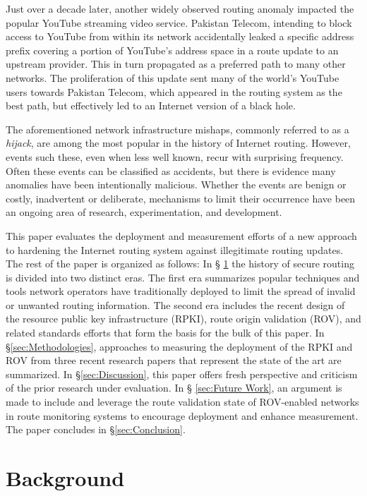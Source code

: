 \documentclass[sigconf]{acmart}
\begin{document}
Just over a decade later, another widely observed routing anomaly
impacted the popular YouTube streaming video
service.\cite{brown_pakistan_2008}  Pakistan Telecom, intending to block
access to YouTube from within its network accidentally leaked a specific
address prefix covering a portion of YouTube's address space in a route
update to an upstream provider.  This in turn propagated as a preferred
path to many other networks.  The proliferation of this update sent many
of the world's YouTube users towards Pakistan Telecom, which appeared in
the routing system as the best path, but effectively led to an Internet
version of a black hole.

The aforementioned network infrastructure mishaps, commonly referred to
as a \emph{hijack}, are among the most popular in the history of
Internet routing.  However, events such these, even when less well
known, recur with surprising frequency.  Often these events can be
classified as accidents, but there is evidence many anomalies have been
intentionally malicious.\cite{madory_bgp_2018}  Whether the events are
benign or costly, inadvertent or deliberate, mechanisms to limit their
occurrence have been an ongoing area of research, experimentation, and
development.

This paper evaluates the deployment and measurement efforts of a new
approach to hardening the Internet routing system against illegitimate
routing updates.  The rest of the paper is organized as follows: In \S
\ref{sec:Background} the history of secure routing is divided into two
distinct eras.  The first era summarizes popular techniques and tools
network operators have traditionally deployed to limit the spread of
invalid or unwanted routing information.  The second era includes the
recent design of the resource public key infrastructure (RPKI), route
origin validation (ROV), and related standards efforts that form the
basis for the bulk of this paper.  In \S \ref{sec:Methodologies},
approaches to measuring the deployment of the RPKI and ROV from three
recent research papers that represent the state of the art are
summarized.  In \S \ref{sec:Discussion}, this paper offers fresh
perspective and criticism of the prior research under evaluation.  In \S
\ref{sec:Future Work}, an argument is made to include and leverage the
route validation state of ROV-enabled networks in route monitoring
systems to encourage deployment and enhance measurement.  The paper
concludes in \S \ref{sec:Conclusion}.

\section{Background}\label{sec:Background}
\end{document}
